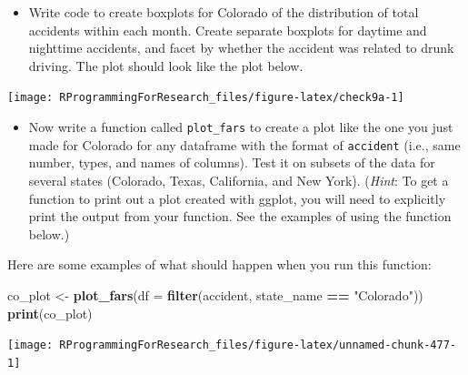 \documentclass[]{book}
\makeatletter
\newenvironment{Shaded}{\begin{snugshade}}{\end{snugshade}}
\newcommand{\KeywordTok}[1]{\textcolor[rgb]{0.13,0.29,0.53}{\textbf{#1}}}
\newcommand{\DataTypeTok}[1]{\textcolor[rgb]{0.13,0.29,0.53}{#1}}
\newcommand{\StringTok}[1]{\textcolor[rgb]{0.31,0.60,0.02}{#1}}
\newcommand{\OperatorTok}[1]{\textcolor[rgb]{0.81,0.36,0.00}{\textbf{#1}}}
\newcommand{\NormalTok}[1]{#1}
\providecommand{\tightlist}{%
  \setlength{\itemsep}{0pt}\setlength{\parskip}{0pt}}
\newenvironment{kframe}{%
\medskip{}
\setlength{\fboxsep}{.8em}
 \def\at@end@of@kframe{}%
 \ifinner\ifhmode%
  \def\at@end@of@kframe{\end{minipage}}%
  \begin{minipage}{\columnwidth}%
 \fi\fi%
 \def\FrameCommand##1{\hskip\@totalleftmargin \hskip-\fboxsep
 \colorbox{shadecolor}{##1}\hskip-\fboxsep
     \hskip-\linewidth \hskip-\@totalleftmargin \hskip\columnwidth}%
 \MakeFramed {\advance\hsize-\width
   \@totalleftmargin\z@ \linewidth\hsize
   \@setminipage}}%
 {\par\unskip\endMakeFramed%
 \at@end@of@kframe}
\renewenvironment{Shaded}{\begin{kframe}}{\end{kframe}}
\theoremstyle{definition}
\theoremstyle{definition}
\theoremstyle{definition}
\theoremstyle{remark}
\makeatother
\begin{document}
\begin{itemize}
\tightlist
\item
  Write code to create boxplots for Colorado of the distribution of
  total accidents within each month. Create separate boxplots for
  daytime and nighttime accidents, and facet by whether the accident was
  related to drunk driving. The plot should look like the plot below.
\end{itemize}

\begin{center}\texttt{[image: RProgrammingForResearch\_files/figure-latex/check9a-1]} \end{center}

\begin{itemize}
\tightlist
\item
  Now write a function called \texttt{plot\_fars} to create a plot like
  the one you just made for Colorado for any dataframe with the format
  of \texttt{accident} (i.e., same number, types, and names of columns).
  Test it on subsets of the data for several states (Colorado, Texas,
  California, and New York). (\emph{Hint}: To get a function to print
  out a plot created with ggplot, you will need to explicitly print the
  output from your function. See the examples of using the function
  below.)
\end{itemize}

Here are some examples of what should happen when you run this function:

\begin{Shaded}
\begin{Highlighting}[]
\NormalTok{co_plot <-}\StringTok{ }\KeywordTok{plot_fars}\NormalTok{(}\DataTypeTok{df =} \KeywordTok{filter}\NormalTok{(accident, state_name }\OperatorTok{==}\StringTok{ "Colorado"}\NormalTok{))}
\KeywordTok{print}\NormalTok{(co_plot)}
\end{Highlighting}
\end{Shaded}

\begin{center}\texttt{[image: RProgrammingForResearch\_files/figure-latex/unnamed-chunk-477-1]} \end{center}

\begin{Shaded}
\end{Shaded}
\end{document}
